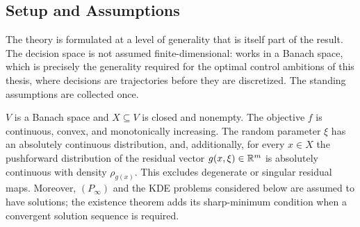 \subsection{Setup and Assumptions}
\label{sec:setupassump}

The theory is formulated at a level of generality that is itself part of
the result. The decision space is not assumed
finite-dimensional: \citet{schuster2025} works in a Banach space, which
is precisely the generality required for the optimal control ambitions
of this thesis, where decisions are trajectories before they are
discretized. The standing assumptions are collected once.

\begin{assumption}
\label{ass:setting}
$V$ is a Banach space and $X \subseteq V$ is closed and nonempty. The
objective $f$ is continuous, convex, and monotonically increasing. The random parameter $\xi$ has an absolutely continuous distribution,
and, additionally, for every $x \in X$ the pushforward
distribution of the residual vector $g(x,\xi) \in \mathbb{R}^m$ is absolutely
continuous with density $\rho_{g(x)}$. This excludes degenerate or
singular residual maps. Moreover, $(P_\infty)$ and the KDE
problems considered below are assumed to have solutions; the existence theorem adds its
sharp-minimum condition when a convergent solution sequence is required.
\end{assumption}


